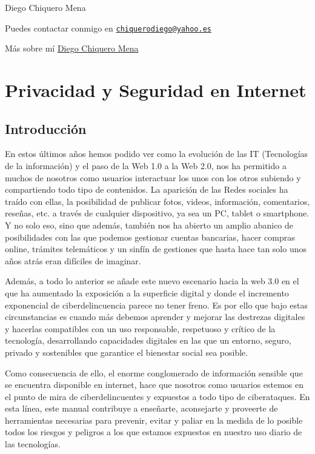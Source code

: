 \documentclass[
  a4paper,
  openany]{book}
\begin{document}
Diego Chiquero Mena

Puedes contactar conmigo en \href{mailto:chiquerodiego@yahoo.es}{\nolinkurl{chiquerodiego@yahoo.es}}

Más sobre mí \href{https://about.me/diegochiquero}{Diego Chiquero Mena}

\hypertarget{privacidad-y-seguridad-en-internet}{%
\chapter{Privacidad y Seguridad en Internet}\label{privacidad-y-seguridad-en-internet}}

\hypertarget{introducciuxf3n}{%
\section{Introducción}\label{introducciuxf3n}}

En estos últimos años hemos podido ver como la evolución de las IT (Tecnologías de la información) y el paso de la Web 1.0 a la Web 2.0, nos ha permitido a muchos de nosotros como usuarios interactuar los unos con los otros subiendo y compartiendo todo tipo de contenidos. La aparición de las Redes sociales ha traído con ellas, la posibilidad de publicar fotos, videos, información, comentarios, reseñas, etc. a través de cualquier dispositivo, ya sea un PC, tablet o smartphone. Y no solo eso, sino que además, también nos ha abierto un amplio abanico de posibilidades con las que podemos gestionar cuentas bancarias, hacer compras online, trámites telemáticos y un sinfín de gestiones que hasta hace tan solo unos años atrás eran difíciles de imaginar.

Además, a todo lo anterior se añade este nuevo escenario hacia la web 3.0 en el que ha aumentado la exposición a la superficie digital y donde el incremento exponencial de ciberdelincuencia parece no tener freno. Es por ello que bajo estas circunstancias es cuando más debemos aprender y mejorar las destrezas digitales y hacerlas compatibles con un uso responsable, respetuoso y crítico de la tecnología, desarrollando capacidades digitales en las que un entorno, seguro, privado y sostenibles que garantice el bienestar social sea posible.

Como consecuencia de ello, el enorme conglomerado de información sensible que se encuentra disponible en internet, hace que nosotros como usuarios estemos en el punto de mira de ciberdelincuentes y expuestos a todo tipo de ciberataques. En esta línea, este manual contribuye a enseñarte, aconsejarte y proveerte de herramientas necesarias para prevenir, evitar y paliar en la medida de lo posible todos los riesgos y peligros a los que estamos expuestos en nuestro uso diario de las tecnologías.
\end{document}
